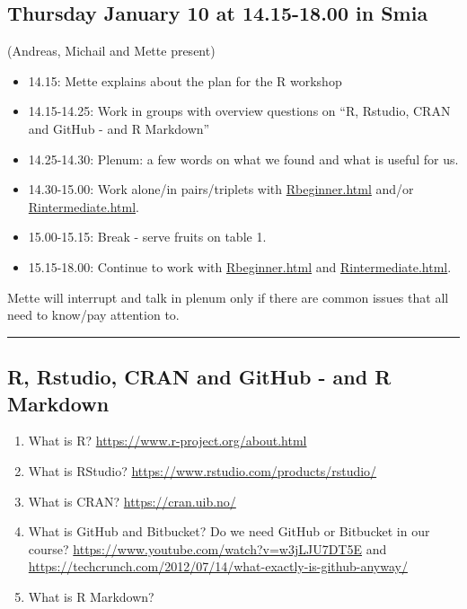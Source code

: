 \documentclass[]{article}
\providecommand{\tightlist}{%
  \setlength{\itemsep}{0pt}\setlength{\parskip}{0pt}}
\begin{document}
\hypertarget{thursday-january-10-at-14.15-18.00-in-smia}{%
\subsection{Thursday January 10 at 14.15-18.00 in
Smia}\label{thursday-january-10-at-14.15-18.00-in-smia}}

(Andreas, Michail and Mette present)

\begin{itemize}
\tightlist
\item
  14.15: Mette explains about the plan for the R workshop
\item
  14.15-14.25: Work in groups with overview questions on ``R, Rstudio,
  CRAN and GitHub - and R Markdown''
\item
  14.25-14.30: Plenum: a few words on what we found and what is useful
  for us.
\item
  14.30-15.00: Work alone/in pairs/triplets with
  \href{https://www.math.ntnu.no/emner/TMA4268/2019v/Rbeginner.html}{Rbeginner.html}
  and/or
  \href{https://www.math.ntnu.no/emner/TMA4268/2019v/Rintermediate.html}{Rintermediate.html}.
\item
  15.00-15.15: Break - serve fruits on table 1.
\item
  15.15-18.00: Continue to work with
  \href{https://www.math.ntnu.no/emner/TMA4268/2019v/Rbeginner.html}{Rbeginner.html}
  and
  \href{https://www.math.ntnu.no/emner/TMA4268/2019v/Rintermediate.html}{Rintermediate.html}.
\end{itemize}

Mette will interrupt and talk in plenum only if there are common issues
that all need to know/pay attention to.

\begin{center}\rule{0.5\linewidth}{\linethickness}\end{center}

\hypertarget{r-rstudio-cran-and-github---and-r-markdown}{%
\subsection{R, Rstudio, CRAN and GitHub - and R
Markdown}\label{r-rstudio-cran-and-github---and-r-markdown}}

\begin{enumerate}
\def\labelenumi{\arabic{enumi})}
\item
  What is R? \url{https://www.r-project.org/about.html}
\item
  What is RStudio? \url{https://www.rstudio.com/products/rstudio/}
\item
  What is CRAN? \url{https://cran.uib.no/}
\item
  What is GitHub and Bitbucket? Do we need GitHub or Bitbucket in our
  course? \url{https://www.youtube.com/watch?v=w3jLJU7DT5E} and
  \url{https://techcrunch.com/2012/07/14/what-exactly-is-github-anyway/}
\item
  What is R Markdown?
\end{enumerate}
\end{document}
